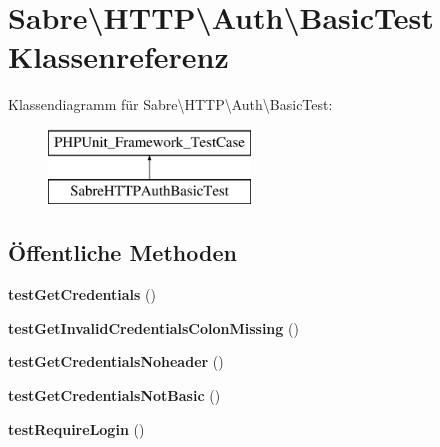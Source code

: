 \hypertarget{class_sabre_1_1_h_t_t_p_1_1_auth_1_1_basic_test}{}\section{Sabre\textbackslash{}H\+T\+TP\textbackslash{}Auth\textbackslash{}Basic\+Test Klassenreferenz}
\label{class_sabre_1_1_h_t_t_p_1_1_auth_1_1_basic_test}
Klassendiagramm für Sabre\textbackslash{}H\+T\+TP\textbackslash{}Auth\textbackslash{}Basic\+Test\+:\begin{figure}[H]
\begin{center}
\leavevmode
\includegraphics[height=2.000000cm]{class_sabre_1_1_h_t_t_p_1_1_auth_1_1_basic_test}
\end{center}
\end{figure}
\subsection*{Öffentliche Methoden}
\begin{DoxyCompactItemize}
\item 
\mbox{\label{class_sabre_1_1_h_t_t_p_1_1_auth_1_1_basic_test_a39a7cb30264ee17fd44d53296a35cb9b}} 
{\bfseries test\+Get\+Credentials} ()
\item 
\mbox{\label{class_sabre_1_1_h_t_t_p_1_1_auth_1_1_basic_test_afdba17290d0d7b24c3bdd3e19e71a9df}} 
{\bfseries test\+Get\+Invalid\+Credentials\+Colon\+Missing} ()
\item 
\mbox{\label{class_sabre_1_1_h_t_t_p_1_1_auth_1_1_basic_test_a692617b74861eacd8766157dac06229e}} 
{\bfseries test\+Get\+Credentials\+Noheader} ()
\item 
\mbox{\label{class_sabre_1_1_h_t_t_p_1_1_auth_1_1_basic_test_a5710cb8996f8298209ce81ddb076f41f}} 
{\bfseries test\+Get\+Credentials\+Not\+Basic} ()
\item 
\mbox{\label{class_sabre_1_1_h_t_t_p_1_1_auth_1_1_basic_test_a5f6ce75821aa663ae6a1467ff6b0dacc}} 
{\bfseries test\+Require\+Login} ()
\end{DoxyCompactItemize}


